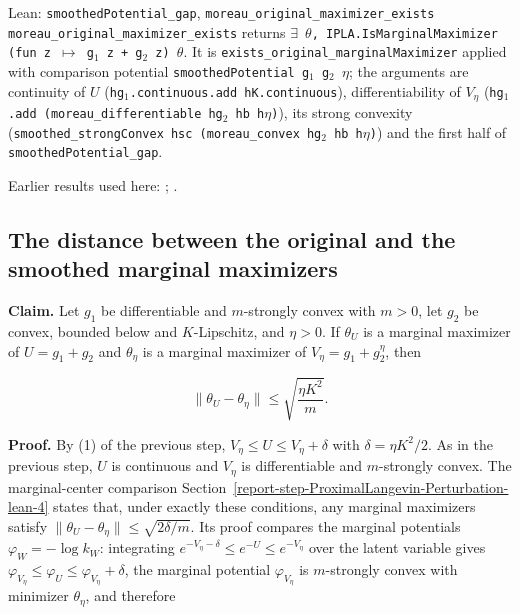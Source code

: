 \documentclass[11pt,a4paper]{report}
\begin{document}
\begin{leanbox}{Lean: \texttt{smoothedPotential\_\allowbreak{}gap}, \texttt{moreau\_\allowbreak{}original\_\allowbreak{}maximizer\_\allowbreak{}exists}}
\texttt{moreau\_\allowbreak{}original\_\allowbreak{}maximizer\_\allowbreak{}exists} returns \texttt{\ensuremath{\exists} \ensuremath{\theta}, IPLA.\allowbreak{}Is\allowbreak{}Marginal\allowbreak{}Maximizer (fun z \ensuremath{\mapsto} g\ensuremath{{}_{1}} z + g\ensuremath{{}_{2}} z) \ensuremath{\theta}}. It is \texttt{exists\_\allowbreak{}original\_\allowbreak{}marginal\allowbreak{}Maximizer} applied with comparison potential \texttt{smoothed\allowbreak{}Potential g\ensuremath{{}_{1}} g\ensuremath{{}_{2}} \ensuremath{\eta}}; the arguments are continuity of \(U\) (\texttt{hg\ensuremath{{}_{1}}.\allowbreak{}continuous.\allowbreak{}add h\allowbreak{}K.\allowbreak{}continuous}), differentiability of \(V_\eta\) (\texttt{hg\ensuremath{{}_{1}}.\allowbreak{}add (moreau\_\allowbreak{}differentiable hg\ensuremath{{}_{2}} hb h\ensuremath{\eta})}), its strong convexity (\texttt{smoothed\_\allowbreak{}strong\allowbreak{}Convex hsc (moreau\_\allowbreak{}convex hg\ensuremath{{}_{2}} hb h\ensuremath{\eta})}) and the first half of \texttt{smoothed\allowbreak{}Potential\_\allowbreak{}gap}.
\end{leanbox}


Earlier results used here: \cite[Section~3.1.1]{LangevinLean2026IPLA}; \cite[Section~3.3.1]{LangevinLean2026IPLA}.
\subsection{\texorpdfstring{The distance between the original and the smoothed marginal maximizers}{The distance between the original and the smoothed marginal maximizers}}
\label{report-step-ProximalLangevin-Theorem-lean-2}


\textbf{Claim.} Let \(g_1\) be differentiable and \(m\)-strongly convex with \(m>0\), let \(g_2\) be convex, bounded below and \(K\)-Lipschitz, and \(\eta>0\). If \(\theta_U\) is a marginal maximizer of \(U=g_1+g_2\) and \(\theta_\eta\) is a marginal maximizer of \(V_\eta=g_1+g_2^\eta\), then


\[\|\theta_U-\theta_\eta\|\le\sqrt{\frac{\eta K^2}{m}} .\]


\textbf{Proof.} By (1) of the previous step, \(V_\eta\le U\le V_\eta+\delta\) with \(\delta=\eta K^2/2\). As in the previous step, \(U\) is continuous and \(V_\eta\) is differentiable and \(m\)-strongly convex. The marginal-center comparison Section~\ref{report-step-ProximalLangevin-Perturbation-lean-4} states that, under exactly these conditions, any marginal maximizers satisfy \(\|\theta_U-\theta_\eta\|\le\sqrt{2\delta/m}\). Its proof compares the marginal potentials \(\varphi_W=-\log k_W\): integrating \(e^{-V_\eta-\delta}\le e^{-U}\le e^{-V_\eta}\) over the latent variable gives \(\varphi_{V_\eta}\le\varphi_U\le\varphi_{V_\eta}+\delta\), the marginal potential \(\varphi_{V_\eta}\) is \(m\)-strongly convex with minimizer \(\theta_\eta\), and therefore
\end{document}
